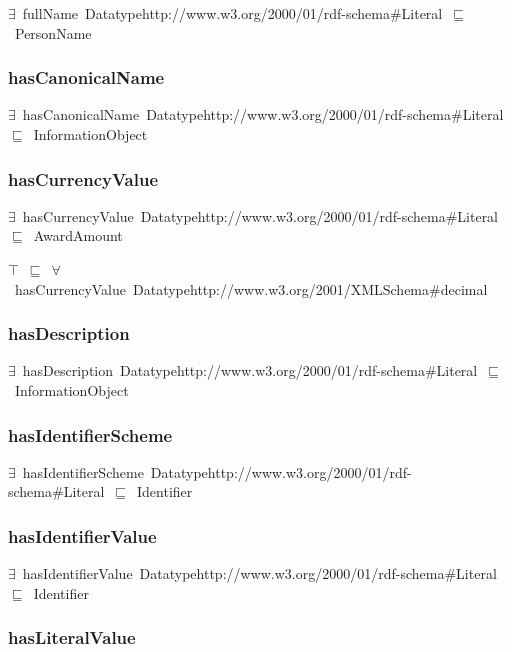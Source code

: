\documentclass{article}
\begin{document}
\ensuremath{\exists}~fullName~Datatypehttp://www.w3.org/2000/01/rdf-schema#Literal~\ensuremath{\sqsubseteq}~PersonName

\subsubsection*{hasCanonicalName}

\ensuremath{\exists}~hasCanonicalName~Datatypehttp://www.w3.org/2000/01/rdf-schema#Literal~\ensuremath{\sqsubseteq}~InformationObject

\subsubsection*{hasCurrencyValue}

\ensuremath{\exists}~hasCurrencyValue~Datatypehttp://www.w3.org/2000/01/rdf-schema#Literal~\ensuremath{\sqsubseteq}~AwardAmount

\ensuremath{\top}~\ensuremath{\sqsubseteq}~\ensuremath{\forall}~hasCurrencyValue~Datatypehttp://www.w3.org/2001/XMLSchema#decimal

\subsubsection*{hasDescription}

\ensuremath{\exists}~hasDescription~Datatypehttp://www.w3.org/2000/01/rdf-schema#Literal~\ensuremath{\sqsubseteq}~InformationObject

\subsubsection*{hasIdentifierScheme}

\ensuremath{\exists}~hasIdentifierScheme~Datatypehttp://www.w3.org/2000/01/rdf-schema#Literal~\ensuremath{\sqsubseteq}~Identifier

\subsubsection*{hasIdentifierValue}

\ensuremath{\exists}~hasIdentifierValue~Datatypehttp://www.w3.org/2000/01/rdf-schema#Literal~\ensuremath{\sqsubseteq}~Identifier

\subsubsection*{hasLiteralValue}
\end{document}
